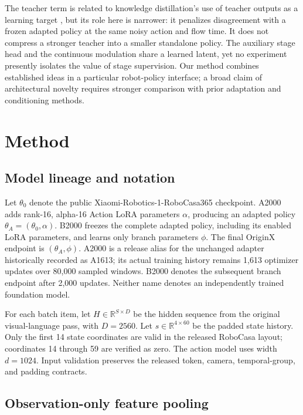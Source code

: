 \documentclass[10pt,twocolumn,letterpaper]{article}
\begin{document}
The teacher term is related to knowledge distillation's use of teacher outputs as a learning target \cite{r9}, but its role here is narrower: it penalizes disagreement with a frozen adapted policy at the same noisy action and flow time. It does not compress a stronger teacher into a smaller standalone policy. The auxiliary stage head and the continuous modulation share a learned latent, yet no experiment presently isolates the value of stage supervision. Our method combines established ideas in a particular robot-policy interface; a broad claim of architectural novelty requires stronger comparison with prior adaptation and conditioning methods.


\section{Method}

\subsection{Model lineage and notation}

Let $\theta_0$ denote the public Xiaomi-Robotics-1-RoboCasa365 checkpoint. A2000 adds rank-16, alpha-16 Action LoRA parameters $\alpha$, producing an adapted policy $\theta_A=(\theta_0,\alpha)$. B2000 freezes the complete adapted policy, including its enabled LoRA parameters, and learns only branch parameters $\phi$. The final OriginX endpoint is $(\theta_A,\phi)$. A2000 is a release alias for the unchanged adapter historically recorded as A1613; its actual training history remains 1,613 optimizer updates over 80,000 sampled windows. B2000 denotes the subsequent branch endpoint after 2,000 updates. Neither name denotes an independently trained foundation model.


For each batch item, let $H\in\mathbb{R}^{S\times D}$ be the hidden sequence from the original visual-language pass, with $D=2560$. Let $s\in\mathbb{R}^{4\times60}$ be the padded state history. Only the first 14 state coordinates are valid in the released RoboCasa layout; coordinates 14 through 59 are verified as zero. The action model uses width $d=1024$. Input validation preserves the released token, camera, temporal-group, and padding contracts.


\subsection{Observation-only feature pooling}
\end{document}
